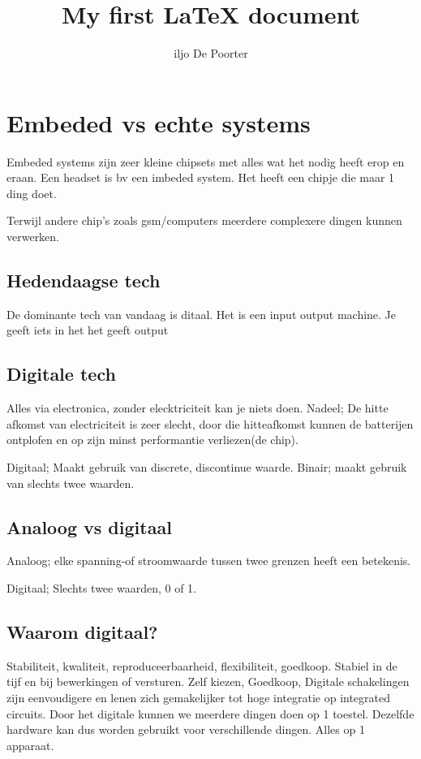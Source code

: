 \documentclass{article}
\author{iljo De Poorter}
\title{My first {\LaTeX} document}
\begin{document}
\maketitle
\section{Embeded vs echte systems}
Embeded systems zijn zeer kleine chipsets met alles wat het nodig heeft erop en eraan. Een headset is bv een imbeded system. Het heeft een chipje die maar 1 ding doet.

Terwijl andere chip's zoals gsm/computers meerdere complexere dingen kunnen verwerken.

\subsection{Hedendaagse tech}
De dominante tech van vandaag is ditaal. Het is een input output machine. Je geeft iets in het het geeft output
\subsection{Digitale tech}
Alles via electronica, zonder elecktriciteit kan je niets doen.
Nadeel; De hitte afkomst van electriciteit is zeer slecht, door die hitteafkomst kunnen de batterijen ontplofen en op zijn minst performantie verliezen(de chip).

Digitaal; Maakt gebruik van discrete, discontinue waarde.
Binair; maakt gebruik van slechts twee waarden.

\subsection{Analoog vs digitaal}

Analoog; elke spanning-of stroomwaarde tussen twee grenzen heeft een betekenis.

Digitaal; Slechts twee waarden, 0 of 1.

\subsection{Waarom digitaal?}
Stabiliteit, kwaliteit, reproduceerbaarheid, flexibiliteit, goedkoop.
Stabiel in de tijf en bij bewerkingen of versturen.
Zelf kiezen,
Goedkoop, Digitale schakelingen zijn eenvoudigere en lenen zich gemakelijker tot hoge integratie op integrated circuits.
Door het digitale kunnen we meerdere dingen doen op 1 toestel.
Dezelfde hardware kan dus worden gebruikt voor verschillende dingen.
Alles op 1 apparaat.
\end{document}

